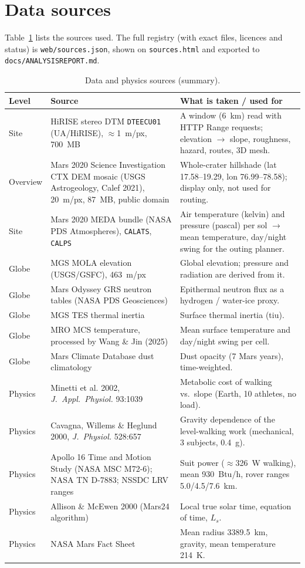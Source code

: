 \documentclass[11pt,a4paper]{article}
\renewcommand{\_}{\textunderscore\allowbreak}
\newcommand{\code}[1]{\texttt{#1}}
\begin{document}
\section{Data sources}
Table~\ref{tab:src} lists the sources used. The full registry (with exact files, licences and status) is \code{web/sources.json}, shown on \code{sources.html} and exported to \code{docs/ANALYSIS\_REPORT.md}.

\begin{table}[h]\centering\small
\begin{tabularx}{\textwidth}{@{}l>{\raggedright\arraybackslash}p{4.2cm}>{\raggedright\arraybackslash}X@{}}
\toprule
\textbf{Level} & \textbf{Source} & \textbf{What is taken / used for}\\\midrule
Site & HiRISE stereo DTM \code{DTEEC\_023524\_1985\_023379\_1985\_U01} (UA/HiRISE), $\approx$1~m/px, 700~MB &
 A window (6~km) read with HTTP Range requests; elevation $\to$ slope, roughness, hazard, routes, 3D mesh.\\
Overview & Mars 2020 Science Investigation CTX DEM mosaic (USGS Astrogeology, Calef 2021), 20~m/px, 87~MB, public domain &
 Whole-crater hillshade (lat 17.58--19.29, lon 76.99--78.58); display only, not used for routing.\\
Site & Mars 2020 MEDA bundle (NASA PDS Atmospheres), \code{CAL\_ATS}, \code{CAL\_PS} &
 Air temperature (kelvin) and pressure (pascal) per sol $\to$ mean temperature, day/night swing for the outing planner.\\
Globe & MGS MOLA elevation (USGS/GSFC), 463~m/px &
 Global elevation; pressure and radiation are derived from it.\\
Globe & Mars Odyssey GRS neutron tables (NASA PDS Geosciences) &
 Epithermal neutron flux as a hydrogen / water-ice proxy.\\
Globe & MGS TES thermal inertia &
 Surface thermal inertia (tiu).\\
Globe & MRO MCS temperature, processed by Wang \& Jin (2025) &
 Mean surface temperature and day/night swing per cell.\\
Globe & Mars Climate Database dust climatology &
 Dust opacity (7 Mars years), time-weighted.\\\midrule
Physics & Minetti et al. 2002, \emph{J.\ Appl.\ Physiol.} 93:1039 &
 Metabolic cost of walking vs.\ slope (Earth, 10 athletes, no load).\\
Physics & Cavagna, Willems \& Heglund 2000, \emph{J.\ Physiol.} 528:657 &
 Gravity dependence of the level-walking work (mechanical, 3 subjects, 0.4~g).\\
Physics & Apollo 16 Time and Motion Study (NASA MSC M72-6); NASA TN D-7883; NSSDC LRV ranges &
 Suit power ($\approx$326~W walking), mean 930~Btu/h, rover ranges 5.0/4.5/7.6~km.\\
Physics & Allison \& McEwen 2000 (Mars24 algorithm) &
 Local true solar time, equation of time, $L_s$.\\
Physics & NASA Mars Fact Sheet &
 Mean radius 3389.5~km, gravity, mean temperature 214~K.\\\bottomrule
\end{tabularx}
\caption{Data and physics sources (summary).}\label{tab:src}
\end{table}
\end{document}

